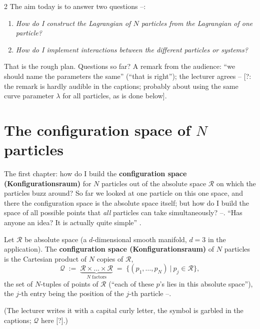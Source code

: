 \begin{paracol}{2}
The aim today is to answer two questions --:
\begin{enumerate}
  \item \emph{How do I construct the Lagrangian of $N$ particles from the Lagrangian of one particle?}
  \item \emph{How do I implement interactions between the different particles or systems?}
\end{enumerate}
That is the rough plan. Questions so far? A remark from the audience: ``we should name the parameters the same'' (``that is right''); the lecturer agrees -- [?: the remark is hardly audible in the captions; probably about using the same curve parameter $\lambda$ for all particles, as is done below].

\section{The configuration space of $N$ particles}\label{sec:mp-config}

The first chapter: how do I build the \textbf{configuration space (Konfigurationsraum)} for $N$ particles out of the absolute space $\mathcal R$ on which the particles buzz around? So far we looked at one particle on this one space, and there the configuration space is the absolute space itself; but how do I build the space of all possible points that \emph{all} particles can take simultaneously? --. ``Has anyone an idea? It is actually quite simple'' .

\begin{definition}\label{def:mp-config}
Let $\mathcal R$ be absolute space (a $d$-dimensional smooth manifold, $d=3$ in the application). The \textbf{configuration space (Konfigurationsraum)} of $N$ particles is the Cartesian product of $N$ copies of $\mathcal R$,
\begin{equation}\label{eq:mp-config}
  \mathcal Q\;:=\;\underbrace{\mathcal R\times\dots\times\mathcal R}_{N\text{ factors}}\;=\;\bigl\{(p_1,\dots,p_N)\ \big|\ p_j\in\mathcal R\bigr\},
\end{equation}
the set of $N$-tuples of points of $\mathcal R$ (``each of these $p$'s lies in this absolute space''), the $j$-th entry being the position of the $j$-th particle --.
\end{definition}
(The lecturer writes it with a capital curly letter, the symbol is garbled in the captions; $\mathcal Q$ here [?].)


\end{paracol}
